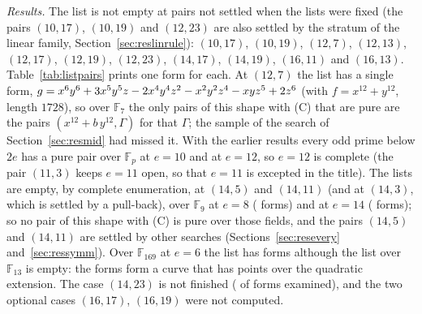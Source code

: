 \documentclass[11pt]{article}
\theoremstyle{definition}
\theoremstyle{remark}
\newcommand{\EXP}[1]{\mbox{EXP-#1}}
\newcommand{\F}{\mathbb{F}}
\begin{document}
\begin{table}[htbp]
\centering\footnotesize

\caption{The lists of forms $\Gamma$ with (C) and the congruence: $e$, the field, the number of forms $\Gamma$ enumerated, the number that satisfy the congruence, the size of the list (those that also satisfy (C)) and whether the enumeration is complete. The case $(14,23)$ was stopped before the end; its list is empty on the part examined and says nothing about the pair.}
\label{tab:lists}
\end{table}

\emph{Results.} The list is not empty at \nlstNew{} pairs not settled when the lists were fixed (the pairs $(10,17)$, $(10,19)$ and $(12,23)$ are also settled by the stratum of the linear family, Section~\ref{sec:reslinrule}): $(10,17)$, $(10,19)$, $(12,7)$, $(12,13)$, $(12,17)$, $(12,19)$, $(12,23)$, $(14,17)$, $(14,19)$, $(16,11)$ and $(16,13)$. Table~\ref{tab:listpairs} prints one form for each. At $(12,7)$ the list has a single form, $g=x^{6}y^{6} + 3x^{5}y^{5}z - 2x^{4}y^{4}z^{2} - x^{2}y^{2}z^{4} - xyz^{5} + 2z^{6}$ (with $f=x^{12}+y^{12}$, length $1728$), so over $\F_7$ the only pairs of this shape with (C) that are pure are the pairs $(x^{12}+b\,y^{12},\Gamma)$ for that $\Gamma$; the sample of the search of Section~\ref{sec:resmid} had missed it. With the earlier results every odd prime below $2e$ has a pure pair over $\F_p$ at $e=10$ and at $e=12$, so $e=12$ is complete (the pair $(11,3)$ keeps $e=11$ open, so that $e=11$ is excepted in the title). The lists are empty, by complete enumeration, at $(14,5)$ and $(14,11)$ (and at $(14,3)$, which is settled by a pull-back), over $\F_9$ at $e=8$ (\nlstGfNineNoneEight{} forms) and at $e=14$ (\nlstGfNineNoneFourteen{} forms); so no pair of this shape with (C) is pure over those fields, and the pairs $(14,5)$ and $(14,11)$ are settled by other searches (Sections~\ref{sec:resevery} and~\ref{sec:ressymm}). Over $\F_{169}$ at $e=6$ the list has \nlstGfHundredSixtyNine{} forms although the list over $\F_{13}$ is empty: the forms form a curve that has points over the quadratic extension. The case $(14,23)$ is not finished (\nlstNotFinishedDone{} of \nlstNotFinishedAll{} forms examined), and the two optional cases $(16,17)$, $(16,19)$ were not computed.

\begin{table}[htbp]
\centering\footnotesize

\caption{One form of the list for each pair settled by \EXP{016}: the pair, the number of forms in its list, the form $g$ over $\F_p$ in the monomials $x^ay^bz^c$ (coefficients of least absolute value) and the length of $U/(Uf+Ug)$; for $e\le10$ the script recomputes the Hilbert function, the length and the rank of $\mu_{3e}$, and the two instruments give the table $(1,2,2,1)$ on $(0,e,3e,4e)$ in every case.}
\label{tab:listpairs}
\end{table}
\end{document}
